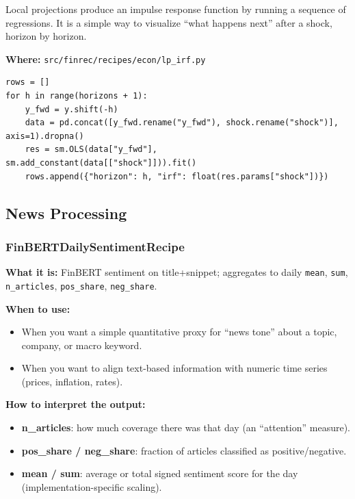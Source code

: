 \documentclass[11pt,a4paper]{article}
\begin{document}
\begin{intuitionbox}
Local projections produce an impulse response function by running a sequence of regressions. It is a simple way to visualize ``what happens next'' after a shock, horizon by horizon.
\end{intuitionbox}

\textbf{Where:} \texttt{src/finrec/recipes/econ/lp\_irf.py}

\begin{lstlisting}
rows = []
for h in range(horizons + 1):
    y_fwd = y.shift(-h)
    data = pd.concat([y_fwd.rename("y_fwd"), shock.rename("shock")], axis=1).dropna()
    res = sm.OLS(data["y_fwd"], sm.add_constant(data[["shock"]])).fit()
    rows.append({"horizon": h, "irf": float(res.params["shock"])})
\end{lstlisting}

\subsection{News Processing}

\subsubsection{FinBERTDailySentimentRecipe}\label{sec:finbert}

\textbf{What it is:} FinBERT sentiment on title+snippet; aggregates to daily \texttt{mean}, \texttt{sum}, \texttt{n\_articles}, \texttt{pos\_share}, \texttt{neg\_share}.

\textbf{When to use:}
\begin{itemize}[leftmargin=2em]
  \item When you want a simple quantitative proxy for ``news tone'' about a topic, company, or macro keyword.
  \item When you want to align text-based information with numeric time series (prices, inflation, rates).
\end{itemize}

\textbf{How to interpret the output:}
\begin{itemize}[leftmargin=2em]
  \item \textbf{n\_articles}: how much coverage there was that day (an ``attention'' measure).
  \item \textbf{pos\_share / neg\_share}: fraction of articles classified as positive/negative.
  \item \textbf{mean / sum}: average or total signed sentiment score for the day (implementation-specific scaling).
\end{itemize}
\end{document}
